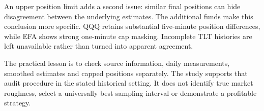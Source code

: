 An upper position limit adds a second issue: similar final positions can hide disagreement between the underlying estimates. The additional funds make this conclusion more specific. QQQ retains substantial five-minute position differences, while EFA shows strong one-minute cap masking. Incomplete TLT histories are left unavailable rather than turned into apparent agreement.

The practical lesson is to check source information, daily measurements, smoothed estimates and capped positions separately. The study supports that audit procedure in the stated historical setting. It does not identify true market roughness, select a universally best sampling interval or demonstrate a profitable strategy.

